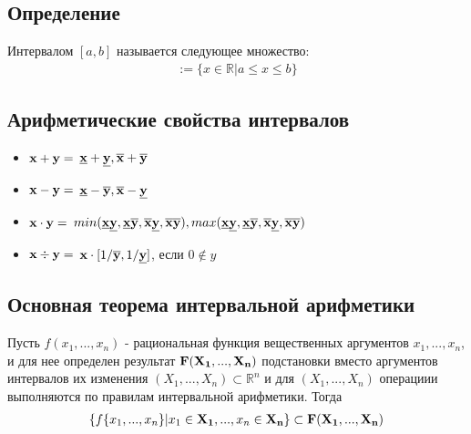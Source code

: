 \documentclass{article}
\begin{document}
    \subsection{Определение}
    Интервалом $[a, b]$ называется следующее множество:
    \begin{gather*}
    [a,b]
        :=\{x \in \mathbb{R} | a \le x \le b\}
    \end{gather*}

    \subsection{Арифметические свойства интервалов}
    \begin{itemize}

        \item {$\bold{x} + \bold{y} =$ {${\bold{\underline{x}} + \bold{\underline{y}},  \bold{\overline{x}} + \bold{\overline{y}}}$}}

        \item {$\bold{x} - \bold{y} =$ {${\bold{\underline{x}} - \bold{\overline{y}},  \bold{\overline{x}} - \bold{\underline{y}}}$}}

        \item {$\bold{x} \cdot \bold{y} =$ {${min(\bold{\underline{x} \underline{y}}, \bold{\underline{x} \overline{y}}, \bold{\overline{x} \underline{y}}, \bold{\overline{x} \overline{y}}) , max(\bold{\underline{x} \underline{y}}, \bold{\underline{x} \overline{y}}, \bold{\overline{x} \underline{y}}, \bold{\overline{x} \overline{y}}) }$}}

        \item {$\bold{x} \div \bold{y} =$ $\bold{x} \cdot[1/\bold{\overline{y}}, 1/\bold{\underline{y}}]$, если $0 \not\in y$}

    \end{itemize}

    \subsection{Основная теорема интервальной арифметики}
    Пусть $f(x_1, ..., x_n)$ - рациональная функция вещественных аргументов $x_1, ..., x_n$, и для нее определен результат $\bold{F(X_1, ..., X_n)}$ подстановки вместо аргументов интервалов их изменения $(X_1, ..., X_n) \subset \mathbb{R}^n$ и для $(X_1, ..., X_n)$ операциии выполняются по правилам интервальной арифметики. Тогда
    \begin{gather*}
        \{f\{x_1,...,x_n\} | x_1 \in \bold{X_1},...,x_n \in \bold{X_n}\} \subset \bold{F(\bold{X_1},...,\bold{X_n}})
    \end{gather*}
\end{document}
